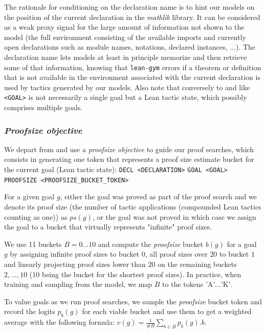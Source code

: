 \documentclass[nohyperref]{article}
\theoremstyle{plain}
\theoremstyle{definition}
\theoremstyle{remark}
\begin{document}
The rationale for conditioning on the declaration name is to hint our models on the position of the current declaration in the \textit{mathlib} library. It can be considered as a weak proxy signal for the large amount of information not shown to the model (the full environment consisting of the available imports and currently open declarations such as module names, notations, declared instances, ...). The declaration name lets models at least in principle memorize and then retrieve some of that information, knowing that \texttt{lean-gym} errors if a theorem or definition that is not available in the environment associated with the current declaration is used by tactics generated by our models. Also note that conversely to \citet{polu2020generative} and like \citet{han2021proof} \texttt{<GOAL>} is not necessarily a single goal but a Lean tactic state, which possibly comprises multiple goals.

\subsubsection{\textit{Proofsize objective}}
\label{proofsize}

We depart from \citet{polu2020generative} and use a \textit{proofsize objective} to guide our proof searches, which consists in generating one token that represents a proof size estimate bucket for the current goal (Lean tactic state): \verb|DECL <DECLARATION>| \verb|GOAL <GOAL>| \verb|PROOFSIZE <PROOFSIZE_BUCKET_TOKEN>|

For a given goal $g$, either the goal was proved as part of the proof search and we denote its proof size (the number of tactic applications (compounded Lean tactics counting as one)) as $ps(g)$, or the goal was not proved in which case we assign the goal to a bucket that virtually represents "infinite" proof sizes.

We use 11 buckets $B = 0...10$ and compute the \textit{proofsize} bucket $b(g)$ for a goal $g$ by assigning infinite proof sizes to bucket $0$, all proof sizes over $20$ to bucket $1$ and linearly projecting proof sizes lower than $20$ on the remaining buckets $2,...,10$ ($10$ being the bucket for the shortest proof sizes). In practice, when training and sampling from the model, we map $B$ to the tokens $\text{'A'}...\text{'K'}$.

To value goals as we run proof searches, we sample the \textit{proofsize} bucket token and record the logits $p_b(g)$ for each viable bucket and use them to get a weighted average with the following formula: $ v(g) = \frac{1}{\#B} \sum_{b \in B} p_b(g).b$.
\end{document}
